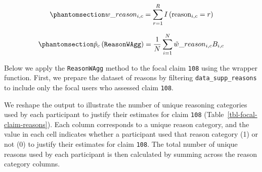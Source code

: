\documentclass[
  11pt,
  a4paper,
]{article}
\begin{document}
\begin{equation}\protect\phantomsection\label{eq-weightReason}{
w\_reason_{i,c}= \sum_{r=1}^R I\left(\text{reason}_{i,c} = r\right)
}\end{equation}

\begin{equation}\protect\phantomsection\label{eq-ReasonWAgg}{
\hat{p}_c\left(\texttt{ReasonWAgg} \right ) = \frac{1}{N}\sum_{i=1}^N \tilde{w}\_{reason}_{i,c}  B_{i,c}
}\end{equation}

Below we apply the \texttt{ReasonWAgg} method to the focal claim
\texttt{108} using the  wrapper function. First, we
prepare the dataset of reasons by filtering \texttt{data\_supp\_reasons}
to include only the focal users who assessed claim \texttt{108}.

We reshape the output to illustrate the number of unique reasoning
categories used by each participant to justify their estimates for claim
\texttt{108} (Table~\ref{tbl-focal-claim-reasons}). Each column
corresponds to a unique reason category, and the value in each cell
indicates whether a participant used that reason category (1) or not (0)
to justify their estimates for claim \texttt{108}. The total number of
unique reasons used by each participant is then calculated by summing
across the reason category columns.
\end{document}
